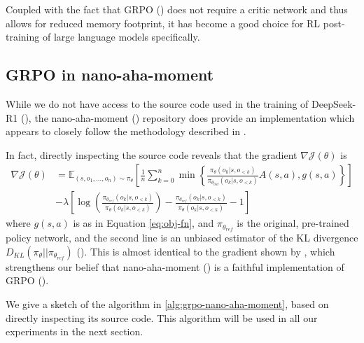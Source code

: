 \documentclass{article} %
\theoremstyle{definition}
\begin{document}
Coupled with the fact that GRPO (\cite{grpo}) does not require a critic network and thus
allows for reduced memory footprint, it has become a good choice for RL post-training of large language models specifically.

\subsection{GRPO in nano-aha-moment}
While we do not have access to the source code used in the training of DeepSeek-R1 (\cite{r1}),
the nano-aha-moment (\cite{nano-aha-moment}) repository does provide an implementation which appears to closely
follow the methodology described in \cite{r1}.

In fact, directly inspecting the source code reveals that the gradient $\nabla \mathcal{J}(\theta)$ is
\begin{equation}
    \label{eq:grpo-grad}
    \begin{array}{rl}
    \nabla \mathcal{J}(\theta) & = \mathbb{E}_{(s, o_1, \dots, o_n) \sim \pi_\theta} \left[ 
        \displaystyle
        \frac{1}{n} \sum_{k = 0}^n \min \left\{
            \frac{\pi_\theta(o_k|s, o_{< k})}{\pi_{\theta_{old}}(o_k|s, o_{< k})} A(s, a),
            g(s, a)
        \right\}
    \right] \\ 
    & {\displaystyle - \lambda \left[\log\left(\frac{\pi_{\theta_{ref}}(o_k|s, o_{< k})}{\pi_{\theta}(o_k|s, o_{< k})}\right) - \frac{\pi_{\theta_{ref}}(o_k|s, o_{< k})}{\pi_{\theta}(o_k|s, o_{< k})} - 1\right]}
    \end{array}
\end{equation}
where $g(s,a)$ is as in Equation \ref{eq:obj-fn}, and $\pi_{\theta_{ref}}$ is the original, 
pre-trained policy network, and the second line is an unbiased estimator of the KL divergence 
$D_{KL}(\pi_\theta || \pi_{\theta_{ref}})$ (\cite{kl-approx}).
This is almost identical to the gradient shown by \cite{grpo}, 
which strengthens our belief that nano-aha-moment (\cite{nano-aha-moment}) is 
a faithful implementation of GRPO (\cite{grpo}).

We give a sketch of the algorithm in \ref{alg:grpo-nano-aha-moment}, based on directly inspecting its source code.
This algorithm will be used in all our experiments in the next section.
\end{document}
